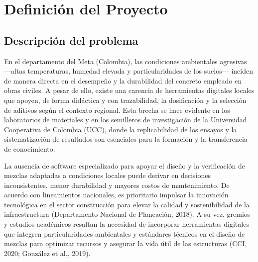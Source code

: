 \section{Definición del Proyecto}

\subsection{Descripción del problema}

En el departamento del Meta (Colombia), las condiciones ambientales agresivas ---altas temperaturas, humedad elevada y particularidades de los suelos--- inciden de manera directa en el desempeño y la durabilidad del concreto empleado en obras civiles. A pesar de ello, existe una carencia de herramientas digitales locales que apoyen, de forma didáctica y con trazabilidad, la dosificación y la selección de aditivos según el contexto regional. Esta brecha se hace evidente en los laboratorios de materiales y en los semilleros de investigación de la Universidad Cooperativa de Colombia (UCC), donde la replicabilidad de los ensayos y la sistematización de resultados son esenciales para la formación y la transferencia de conocimiento.

La ausencia de software especializado para apoyar el diseño y la verificación de mezclas adaptadas a condiciones locales puede derivar en decisiones inconsistentes, menor durabilidad y mayores costos de mantenimiento. De acuerdo con lineamientos nacionales, es prioritario impulsar la innovación tecnológica en el sector construcción para elevar la calidad y sostenibilidad de la infraestructura (Departamento Nacional de Planeación, 2018). A su vez, gremios y estudios académicos resaltan la necesidad de incorporar herramientas digitales que integren particularidades ambientales y estándares técnicos en el diseño de mezclas para optimizar recursos y asegurar la vida útil de las estructuras (CCI, 2020; González et al., 2019).

